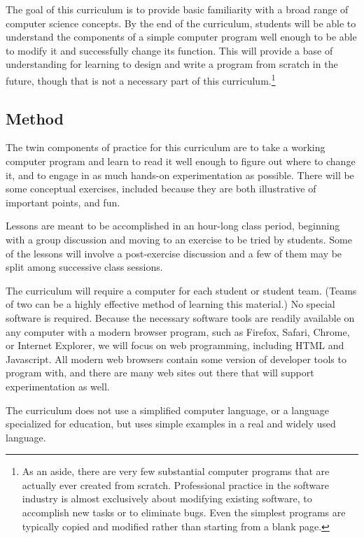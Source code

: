 \documentclass[11pt]{article}
\begin{document}
The goal of this curriculum is to provide basic familiarity with a
broad range of computer science concepts.  By the end of the
curriculum, students will be able to understand the components of a
simple computer program well enough to be able to modify it and
successfully change its function.  This will provide a base of
understanding for learning to design and write a program from scratch
in the future, though that is not a necessary part of this
curriculum.\footnote{As an aside, there are very few substantial
  computer programs that are actually ever created from scratch.
  Professional practice in the software industry is almost exclusively
  about modifying existing software, to accomplish new tasks or to
  eliminate bugs.  Even the simplest programs are typically copied and
  modified rather than starting from a blank page.}


\subsection{Method}

The twin components of practice for this curriculum are to take a
working computer program and learn to read it well enough to figure
out where to change it, and to engage in as much hands-on
experimentation as possible.  There will be some conceptual exercises,
included because they are both illustrative of important points, and
fun.

Lessons are meant to be accomplished in an hour-long class period,
beginning with a group discussion and moving to an exercise to be
tried by students.  Some of the lessons will involve a post-exercise
discussion and a few of them may be split among successive class
sessions.

The curriculum will require a computer for each student or student
team.  (Teams of two can be a highly effective method of learning this
material.)  No special software is required.  Because the necessary
software tools are readily available on any computer with a modern
browser program, such as Firefox, Safari, Chrome, or Internet
Explorer, we will focus on web programming, including HTML and
Javascript.  All modern web browsers contain some version of developer
tools to program with, and there are many web sites out there that
will support experimentation as well.

The curriculum does not use a simplified computer language, or a
language specialized for education, but uses simple examples in a real
and widely used language.
\end{document}
